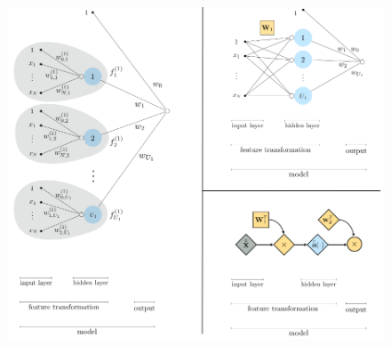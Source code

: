 \documentclass{book}
\begin{document}
    \begin{figure}[H]
        \centering
        \includegraphics[width=1.0\linewidth]{images/code20.png}
        \label{fig:code20}
    \end{figure}
\end{document}
